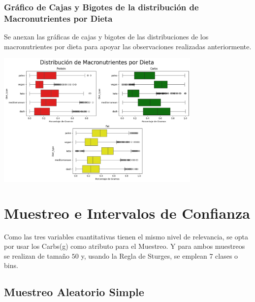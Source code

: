 \documentclass[12pt,a4paper]{article}
\begin{document}
    \subsubsection{Gráfico de Cajas y Bigotes de la distribución de Macronutrientes por Dieta}
        Se anexan las gráficas de cajas y bigotes de las distribuciones de los 
        macronutrientes por dieta para apoyar las observaciones realizadas anteriormente.
        \begin{center}
            \includegraphics[width=0.75\textwidth]{Resources/2_03_plot_06.png}
        \end{center}

\newpage

\section{Muestreo e Intervalos de Confianza}
    Como las tres variables cuantitativas tienen el mismo nivel 
    de relevancia, se opta por usar los Carbs(g) como atributo 
    para el Muestreo. Y para ambos muestreos se realizan de 
    tamaño $50$ y, usando la Regla de Sturges, se emplean 7 clases 
    o bins.
    
    \subsection{Muestreo Aleatorio Simple}
        
\end{document}
